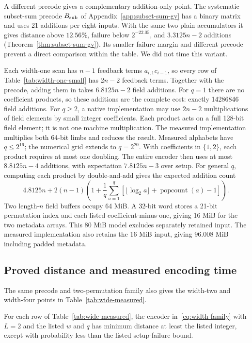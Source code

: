 A different precode gives a complementary addition-only point.
The systematic subset-sum precode $B_{\rm sub}$ of
Appendix~\ref{app:subset-sum-gv} has a binary matrix and uses 21
additions per eight inputs. With the same two plain accumulators it
gives distance above $12.56\%$, failure below $2^{-22.05}$, and
$3.3125n-2$ additions (Theorem~\ref{thm:subset-sum-gv}). Its smaller
failure margin and different precode prevent a direct comparison within
the table. We did not time this variant.

Each width-one scan has $n-1$ feedback terms $a_{i,1}c_{i-1}$, so every
row of Table~\ref{tab:width-one-small} has $2n-2$ feedback terms.
Together with the precode, adding them in takes $6.8125n-2$ field
additions. For $q=1$ there are no coefficient products, so these
additions are the complete cost: exactly 14286846 field additions.
For $q\ge2$, a native implementation may use $2n-2$ multiplications
of field elements by small integer coefficients. Each product acts on
a full 128-bit field element; it is not one machine multiplication.
The measured implementation multiplies both 64-bit limbs and reduces
the result. Measured alphabets have $q\le2^{16}$; the numerical grid
extends to $q=2^{20}$.
With coefficients in $\{1,2\}$, each product requires
at most one doubling. The entire encoder then uses at most
$8.8125n-4$ additions, with expectation $7.8125n-3$ over setup.
For general $q$, computing each product by double-and-add gives the
expected addition count
\[
 4.8125n+2(n-1)\left(1+\frac1q\sum_{a=1}^q
 [\lfloor\log_2a\rfloor+\operatorname{popcount}(a)-1]\right).
\]
Two length-$n$ field buffers occupy 64 MiB. A 32-bit word stores a
21-bit permutation index and each listed coefficient-minus-one, giving
16 MiB for the two metadata arrays. This 80 MiB model excludes separately
retained input. The measured implementation also retains the 16 MiB
input, giving 96.008 MiB including padded metadata.

\subsection{Proved distance and measured encoding time}\label{sec:matched-timings}

The same precode and two-permutation family also gives the width-two
and width-four points in Table~\ref{tab:wide-measured}.

\begin{theorem}\label{thm:wider-guarantees}
For each row of Table~\ref{tab:wide-measured}, the encoder
in~\eqref{eq:width-family} with $L=2$ and the listed $w$ and $q$ has
minimum distance at least the listed integer, except with probability
less than the listed setup-failure bound.
\end{theorem}

